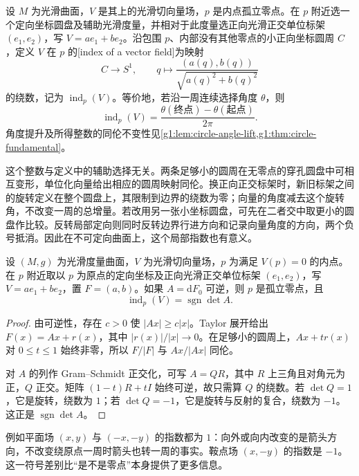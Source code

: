 \begin{definition}
	\label{g1:def:surface-vector-index}
	设 \(M\) 为光滑曲面，\(V\) 是其上的光滑切向量场，\(p\) 是内点孤立零点。在 \(p\) 附近选一个定向坐标圆盘及辅助光滑度量，并相对于此度量选正向光滑正交单位标架 \((e_1,e_2)\)，写 \(V=a e_1+b e_2\)。沿包围 \(p\)、内部没有其他零点的小正向坐标圆周 \(C\)，定义 \(V\) 在 \(p\) 的[index of a vector field]为映射
	\[
		C\longrightarrow S^1,\qquad q\longmapsto\frac{(a(q),b(q))}{\sqrt{a(q)^2+b(q)^2}}
	\]
	的绕数，记为 \(\operatorname{ind}_p(V)\)。等价地，若沿一周连续选择角度 \(\theta\)，则
	\[
		\operatorname{ind}_p(V)=\frac{\theta(\text{终点})-\theta(\text{起点})}{2\pi}.
	\]
	角度提升及所得整数的同伦不变性见\cref{g1:lem:circle-angle-lift,g1:thm:circle-fundamental}。
\end{definition}

这个整数与定义中的辅助选择无关。两条足够小的圆周在无零点的穿孔圆盘中可相互变形，单位化向量给出相应的圆周映射同伦。换正向正交标架时，新旧标架之间的旋转定义在整个圆盘上，其限制到边界的绕数为零；向量的角度减去这个旋转角，不改变一周的总增量。若改用另一张小坐标圆盘，可先在二者交中取更小的圆盘作比较。反转局部定向则同时反转边界行进方向和记录向量角度的方向，两个负号抵消。因此在不可定向曲面上，这个局部指数也有意义。

\begin{proposition}
	\label{g1:prop:nondegenerate-vector-index}
	设 \((M,g)\) 为光滑度量曲面，\(V\) 为光滑切向量场，\(p\) 为满足 \(V(p)=0\) 的内点。在 \(p\) 附近取以 \(p\) 为原点的定向坐标及正向光滑正交单位标架 \((e_1,e_2)\)，写 \(V=ae_1+be_2\)，置 \(F=(a,b)\)。如果 \(A=\mathrm{d}F_0\) 可逆，则 \(p\) 是孤立零点，且
	\[
		\operatorname{ind}_p(V)=\operatorname{sgn}\det A.
	\]
\end{proposition}
\begin{proof}
	由可逆性，存在 \(c>0\) 使 \(|Ax|\ge c|x|\)。Taylor 展开给出 \(F(x)=Ax+r(x)\)，其中 \(|r(x)|/|x|\to0\)。在足够小的圆周上，\(Ax+t r(x)\) 对 \(0\le t\le1\) 始终非零，所以 \(F/|F|\) 与 \(Ax/|Ax|\) 同伦。

	对 \(A\) 的列作 Gram--Schmidt 正交化，可写 \(A=QR\)，其中 \(R\) 上三角且对角元为正，\(Q\) 正交。矩阵 \((1-t)R+tI\) 始终可逆，故只需算 \(Q\) 的绕数。若 \(\det Q=1\)，它是旋转，绕数为 \(1\)；若 \(\det Q=-1\)，它是旋转与反射的复合，绕数为 \(-1\)。这正是 \(\operatorname{sgn}\det A\)。
\end{proof}

例如平面场 \((x,y)\) 与 \((-x,-y)\) 的指数都为 \(1\)：向外或向内改变的是箭头方向，不改变绕原点一周时箭头也转一周的事实。鞍点场 \((x,-y)\) 的指数是 \(-1\)。这一符号差别比“是不是零点”本身提供了更多信息。

